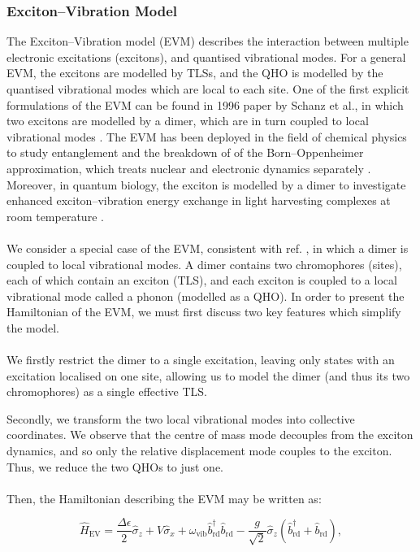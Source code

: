 \documentclass[12pt]{article}
\begin{document}
\subsubsection{Exciton--Vibration Model}  \label{sec:theory_subsub_EVM}
The Exciton--Vibration model (EVM) describes the interaction between multiple electronic excitations (excitons), and quantised vibrational modes. For a general EVM, the excitons are modelled by TLSs, and the QHO is modelled by the quantised vibrational modes which are local to each site. One of the first explicit formulations of the EVM can be found in 1996 paper by Schanz et al., in which two excitons are modelled by a dimer, which are in turn coupled to local vibrational modes \cite{ExVib1997-First}. The EVM has been deployed in the field of chemical physics to study entanglement and the breakdown of of the Born--Oppenheimer approximation, which treats nuclear and electronic dynamics separately \cite{ExVib2015-ChemPhysBorn}. Moreover, in quantum biology, the exciton is modelled by a dimer to investigate enhanced exciton--vibration energy exchange in light harvesting complexes at room temperature \cite{ExVib2014-Alexandra}.\\
\\
We consider a special case of the EVM, consistent with ref. \cite{ExVib2014-Alexandra}, in which a dimer is coupled to local vibrational modes. A dimer contains two chromophores (sites), each of which contain an exciton (TLS), and each exciton is coupled to a local vibrational mode called a phonon (modelled as a QHO). In order to present the Hamiltonian of the EVM, we must first discuss two key features which simplify the model.\\
\\
We firstly restrict the dimer to a single excitation, leaving only states with an excitation localised on one site, allowing us to model the dimer (and thus its two chromophores) as a single effective TLS.

Secondly, we transform the two local vibrational modes into collective coordinates. We observe that the centre of mass mode decouples from the exciton dynamics, and so only the relative displacement mode couples to the exciton. Thus, we reduce the two QHOs to just one.\\
\\
Then, the Hamiltonian describing the EVM may be written as:

\begin{equation} \label{eqn:H_EV}
    \hat{H}_{\scriptscriptstyle \text{EV}} = \frac{\Delta\epsilon}{2}\hat{\sigma}_z + V\hat{\sigma}_x + \omega_{\scriptscriptstyle \text{vib}} \hat{b}_{\scriptscriptstyle \text{rd}}^\dagger \hat{b}_{\scriptscriptstyle \text{rd}} -\frac{g}{\sqrt{2}}\hat{\sigma}_z\left(\hat{b}_{\scriptscriptstyle \text{rd}}^\dagger + \hat{b}_{\scriptscriptstyle \text{rd}}\right),
\end{equation}
\end{document}

